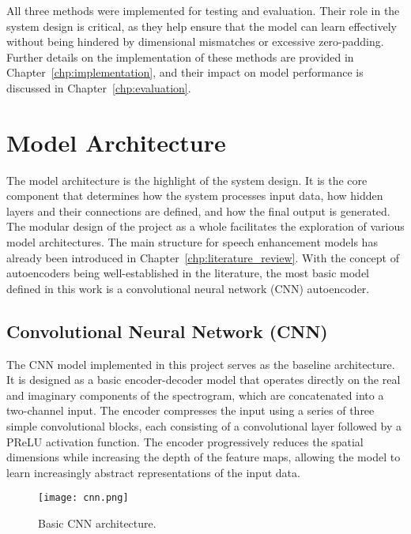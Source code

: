 All three methods were implemented for testing and evaluation. Their role in the system design is critical, as they help ensure that the model can learn effectively without being hindered by dimensional mismatches or excessive zero-padding. Further details on the implementation of these methods are provided in Chapter~\ref{chp:implementation}, and their impact on model performance is discussed in Chapter~\ref{chp:evaluation}.

\section{Model Architecture}
\label{sec:model_architecture}

The model architecture is the highlight of the system design. It is the core component that determines how the system processes input data, how hidden layers and their connections are defined, and how the final output is generated. The modular design of the project as a whole facilitates the exploration of various model architectures. The main structure for speech enhancement models has already been introduced in Chapter~\ref{chp:literature_review}. With the concept of autoencoders being well-established in the literature, the most basic model defined in this work is a convolutional neural network (CNN) autoencoder.

\subsection{Convolutional Neural Network (CNN)}

The CNN model implemented in this project serves as the baseline architecture. It is designed as a basic encoder-decoder model that operates directly on the real and imaginary components of the spectrogram, which are concatenated into a two-channel input. The encoder compresses the input using a series of three simple convolutional blocks, each consisting of a convolutional layer followed by a PReLU activation function. The encoder progressively reduces the spatial dimensions while increasing the depth of the feature maps, allowing the model to learn increasingly abstract representations of the input data.

\begin{figure}[h]
    \centering
    \texttt{[image: cnn.png]}
    \caption{\label{fig:cnn}Basic CNN architecture.}
\end{figure}

